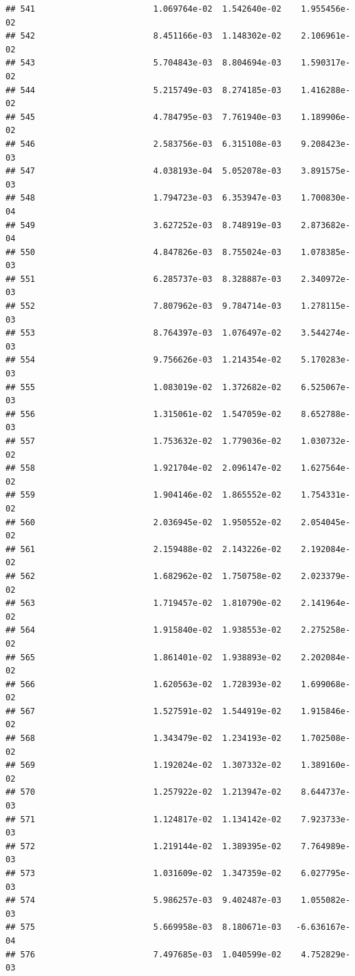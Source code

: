\documentclass[
]{article}
\begin{document}
\begin{verbatim}
## 541                        1.069764e-02  1.542640e-02    1.955456e-02
## 542                        8.451166e-03  1.148302e-02    2.106961e-02
## 543                        5.704843e-03  8.804694e-03    1.590317e-02
## 544                        5.215749e-03  8.274185e-03    1.416288e-02
## 545                        4.784795e-03  7.761940e-03    1.189906e-02
## 546                        2.583756e-03  6.315108e-03    9.208423e-03
## 547                        4.038193e-04  5.052078e-03    3.891575e-03
## 548                        1.794723e-03  6.353947e-03    1.700830e-04
## 549                        3.627252e-03  8.748919e-03    2.873682e-04
## 550                        4.847826e-03  8.755024e-03    1.078385e-03
## 551                        6.285737e-03  8.328887e-03    2.340972e-03
## 552                        7.807962e-03  9.784714e-03    1.278115e-03
## 553                        8.764397e-03  1.076497e-02    3.544274e-03
## 554                        9.756626e-03  1.214354e-02    5.170283e-03
## 555                        1.083019e-02  1.372682e-02    6.525067e-03
## 556                        1.315061e-02  1.547059e-02    8.652788e-03
## 557                        1.753632e-02  1.779036e-02    1.030732e-02
## 558                        1.921704e-02  2.096147e-02    1.627564e-02
## 559                        1.904146e-02  1.865552e-02    1.754331e-02
## 560                        2.036945e-02  1.950552e-02    2.054045e-02
## 561                        2.159488e-02  2.143226e-02    2.192084e-02
## 562                        1.682962e-02  1.750758e-02    2.023379e-02
## 563                        1.719457e-02  1.810790e-02    2.141964e-02
## 564                        1.915840e-02  1.938553e-02    2.275258e-02
## 565                        1.861401e-02  1.938893e-02    2.202084e-02
## 566                        1.620563e-02  1.728393e-02    1.699068e-02
## 567                        1.527591e-02  1.544919e-02    1.915846e-02
## 568                        1.343479e-02  1.234193e-02    1.702508e-02
## 569                        1.192024e-02  1.307332e-02    1.389160e-02
## 570                        1.257922e-02  1.213947e-02    8.644737e-03
## 571                        1.124817e-02  1.134142e-02    7.923733e-03
## 572                        1.219144e-02  1.389395e-02    7.764989e-03
## 573                        1.031609e-02  1.347359e-02    6.027795e-03
## 574                        5.986257e-03  9.402487e-03    1.055082e-03
## 575                        5.669958e-03  8.180671e-03   -6.636167e-04
## 576                        7.497685e-03  1.040599e-02    4.752829e-03

\end{verbatim}
\end{document}
